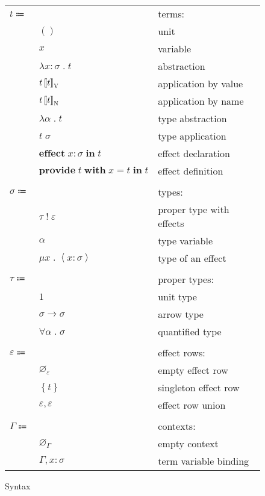\documentclass[12pt]{article}
\newcommand\anno[2]{#1 : #2} %
\newcommand\term{t}
\newcommand\eunit{()}
\newcommand\evar{x}
\newcommand\eabs[2]{\lambda #1 \; . \; #2} %
\newcommand\eappbv[2]{#1 \left\llbracket #2 \right\rrbracket_{\textsc{V}}} %
\newcommand\eappbn[2]{#1 \left\llbracket #2 \right\rrbracket_{\textsc{N}}} %
\newcommand\etabs[2]{\lambda #1 \; . \; #2} %
\newcommand\etapp[2]{#1 \; #2}
\newcommand\eeffect[3]{\textbf{effect} \; \anno{#1}{#2} \; \textbf{in} \; #3}
\newcommand\eprovide[4]{\textbf{provide} \; #1 \; \textbf{with} \; #2 = #3 \; \textbf{in} \; #4}
\newcommand\type{\sigma}
\newcommand\tptwithr[2]{#1 \; ! \; #2} %
\newcommand\tvar{\alpha}
\newcommand\teffect[3]{\mu #1 \; . \; \left\langle\anno{#2}{#3}\right\rangle} %
\newcommand\properType{\tau}
\newcommand\ptunit{1}
\newcommand\ptarrow[2]{#1 \rightarrow #2} %
\newcommand\ptforall[2]{\forall #1 \; . \; #2} %
\newcommand\row{\varepsilon}
\newcommand\rempty{\varnothing_{\row}}
\newcommand\rsingleton[1]{\left\{ #1 \right\}}
\newcommand\runion[2]{#1, #2}
\newcommand\context{\Gamma}
\newcommand\cempty{\varnothing_{\context}}
\newcommand\ceextend[2]{#1, #2}
\begin{document}
  \begin{figure}
    \begin{mdframed}[backgroundcolor=none]
      \begin{center}
        \begin{tabular}{l l l}
          $\term \Coloneqq $ & & terms: \\
          & $\eunit$ & unit \\
          & $\evar$ & variable \\
          & $\eabs{\anno{\evar}{\type}}{\term}$ & abstraction \\
          & $\eappbv{\term}{\term}$ & application by value \\
          & $\eappbn{\term}{\term}$ & application by name \\
          & \color{red} $\etabs{\tvar}{\term}$ & \color{red} type abstraction \\
          & \color{red} $\etapp{\term}{\type}$ & \color{red} type application \\
          & $\eeffect{\evar}{\type}{\term}$ & effect declaration \\
          & $\eprovide{\term}{\evar}{\term}{\term}$ & effect definition \\
          \\
          $\type \Coloneqq$ & & types: \\
          & $\tptwithr{\properType}{\row}$ & proper type with effects \\
          & $\tvar$ & type variable \\
          & $\teffect{\evar}{\evar}{\type}$ & type of an effect \\
          \\
          $\properType \Coloneqq$ & & proper types: \\
          & $\ptunit$ & unit type \\
          & $\ptarrow{\type}{\type}$ & arrow type \\
          & \color{red} $\ptforall{\tvar}{\type}$ & \color{red} quantified type \\
          \\
          $\row \Coloneqq$ & & effect rows: \\
          & $\rempty$ & empty effect row \\
          & $\rsingleton{\term}$ & singleton effect row \\
          & $\runion{\row}{\row}$ & effect row union \\
          \\
          $\context \Coloneqq$ & & contexts: \\
          & $\cempty$ & empty context \\
          & $\ceextend{\context}{\anno{\evar}{\type}}$ & term variable binding \\
        \end{tabular}
      \end{center}

      \caption{Syntax}\label{fig:syntax}
    \end{mdframed}
  \end{figure}
\end{document}
